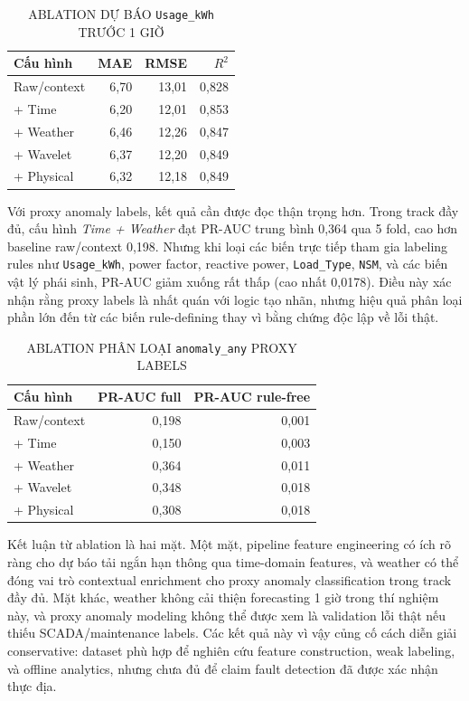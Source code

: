 \documentclass[conference]{IEEEtran}
\begin{document}
\begin{table}[htbp]
\caption{ABLATION DỰ BÁO \texttt{Usage\_kWh} TRƯỚC 1 GIỜ}
\label{tab:ablation_forecast}
\centering
\small
\begin{tabular}{@{}lrrr@{}}
\toprule
Cấu hình & MAE & RMSE & $R^2$ \\
\midrule
Raw/context & 6,70 & 13,01 & 0,828 \\
+ Time & 6,20 & 12,01 & 0,853 \\
+ Weather & 6,46 & 12,26 & 0,847 \\
+ Wavelet & 6,37 & 12,20 & 0,849 \\
+ Physical & 6,32 & 12,18 & 0,849 \\
\bottomrule
\end{tabular}
\end{table}

Với proxy anomaly labels, kết quả cần được đọc thận trọng hơn.
Trong track đầy đủ, cấu hình \textit{Time + Weather} đạt PR-AUC trung bình 0,364 qua 5 fold,
cao hơn baseline raw/context 0,198.
Nhưng khi loại các biến trực tiếp tham gia labeling rules như \texttt{Usage\_kWh}, power factor,
reactive power, \texttt{Load\_Type}, \texttt{NSM}, và các biến vật lý phái sinh, PR-AUC giảm xuống rất thấp
(cao nhất 0,0178). Điều này xác nhận rằng proxy labels là nhất quán với logic tạo nhãn,
nhưng hiệu quả phân loại phần lớn đến từ các biến rule-defining thay vì bằng chứng độc lập về lỗi thật.

\begin{table}[htbp]
\caption{ABLATION PHÂN LOẠI \texttt{anomaly\_any} PROXY LABELS}
\label{tab:ablation_proxy}
\centering
\small
\begin{tabular}{@{}lrr@{}}
\toprule
Cấu hình & PR-AUC full & PR-AUC rule-free \\
\midrule
Raw/context & 0,198 & 0,001 \\
+ Time & 0,150 & 0,003 \\
+ Weather & 0,364 & 0,011 \\
+ Wavelet & 0,348 & 0,018 \\
+ Physical & 0,308 & 0,018 \\
\bottomrule
\end{tabular}
\end{table}

Kết luận từ ablation là hai mặt.
Một mặt, pipeline feature engineering có ích rõ ràng cho dự báo tải ngắn hạn thông qua time-domain features,
và weather có thể đóng vai trò contextual enrichment cho proxy anomaly classification trong track đầy đủ.
Mặt khác, weather không cải thiện forecasting 1 giờ trong thí nghiệm này,
và proxy anomaly modeling không thể được xem là validation lỗi thật nếu thiếu SCADA/maintenance labels.
Các kết quả này vì vậy củng cố cách diễn giải conservative: dataset phù hợp để nghiên cứu feature construction,
weak labeling, và offline analytics, nhưng chưa đủ để claim fault detection đã được xác nhận thực địa.
\end{document}
